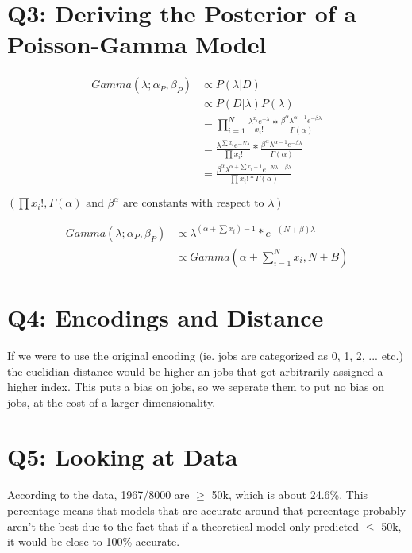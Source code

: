 \documentclass{article}
\begin{document}
    \section*{Q3: Deriving the Posterior of a Poisson-Gamma Model}

        \begin{align*}
            Gamma(\lambda;\alpha_P, \beta_P) &\propto P(\lambda|D)\\
            &\propto P(D|\lambda)P(\lambda)\\
            & = \prod^N_{i=1}\frac{\lambda^{x_i}e^{-\lambda}}{x_i!} * \frac{\beta^\alpha\lambda^{\alpha-1}e^{-\beta\lambda}}{\Gamma(\alpha)}\\
            & = \frac{\lambda^{\sum x_i} e^{-N\lambda}}{\prod x_i!}*\frac{\beta^\alpha\lambda^{\alpha-1}e^{-\beta\lambda}}{\Gamma(\alpha)}\\
            & = \frac{\beta^\alpha\lambda^{ \alpha + \sum x_i- 1} e^{-N\lambda-\beta\lambda}}{\prod x_i!*\Gamma(\alpha)}
        \end{align*}
        \begin{center}$\left(\prod x_i!, \Gamma(\alpha) \text{ and } \beta^\alpha \text{ are constants with respect to } \lambda\right)$\end{center}
        \begin{align*}
            Gamma(\lambda;\alpha_P, \beta_P) &\propto \lambda^{\left(\alpha + \sum x_i\right) - 1}*e^{-(N+\beta)\lambda}\\
            &\propto Gamma\left(\alpha + \sum_{i=1}^N x_i , N+B\right)
        \end{align*}
            
    \section*{Q4: Encodings and Distance}
        \quad If we were to use the original encoding (ie. jobs are categorized as 0, 1, 2, ... etc.) the euclidian distance would be higher an jobs that got arbitrarily assigned a higher index.
        This puts a bias on jobs, so we seperate them to put no bias on jobs, at the cost of a larger dimensionality.
    \section*{Q5: Looking at Data}
        \quad According to the data, 1967/8000 are $\geq$ 50k, which is about 24.6\%. 
        This percentage means that models that are accurate around that percentage probably aren't the best due to the fact that if a theoretical model only predicted $\le$ 50k, it would be close to 100\% accurate.    
\end{document}
